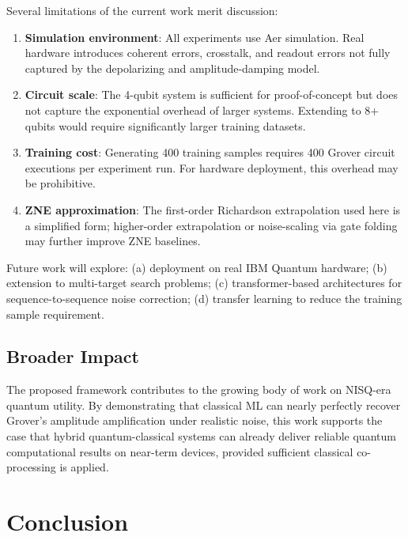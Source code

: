 \documentclass[journal]{IEEEtran}
\begin{document}
Several limitations of the current work merit discussion:
\begin{enumerate}
  \item \textbf{Simulation environment}: All experiments use Aer simulation. Real hardware introduces coherent errors, crosstalk, and readout errors not fully captured by the depolarizing and amplitude-damping model.
  \item \textbf{Circuit scale}: The 4-qubit system is sufficient for proof-of-concept but does not capture the exponential overhead of larger systems. Extending to 8+ qubits would require significantly larger training datasets.
  \item \textbf{Training cost}: Generating 400 training samples requires 400 Grover circuit executions per experiment run. For hardware deployment, this overhead may be prohibitive.
  \item \textbf{ZNE approximation}: The first-order Richardson extrapolation used here is a simplified form; higher-order extrapolation or noise-scaling via gate folding may further improve ZNE baselines.
\end{enumerate}

Future work will explore: (a) deployment on real IBM Quantum hardware; (b) extension to multi-target search problems; (c) transformer-based architectures for sequence-to-sequence noise correction; (d) transfer learning to reduce the training sample requirement.

\subsection{Broader Impact}

The proposed framework contributes to the growing body of work on NISQ-era quantum utility. By demonstrating that classical ML can nearly perfectly recover Grover's amplitude amplification under realistic noise, this work supports the case that hybrid quantum-classical systems can already deliver reliable quantum computational results on near-term devices, provided sufficient classical co-processing is applied.

\section{Conclusion}
\end{document}

